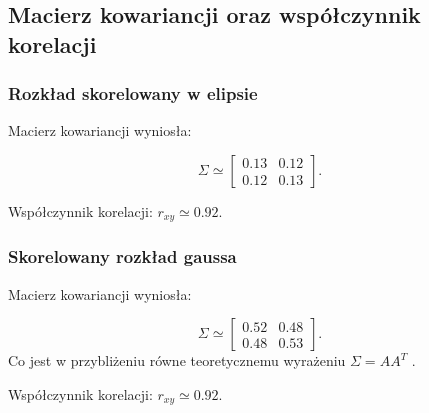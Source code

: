 \documentclass[a4paper,12pt,twoside]{article}
\begin{document}
\subsection{Macierz kowariancji oraz współczynnik korelacji}

\subsubsection{Rozkład skorelowany w elipsie}
Macierz kowariancji wyniosła:

\begin{equation*}
    \Sigma \simeq
    \begin{bmatrix}
            0.13 & 0.12 \\
            0.12 & 0.13
    \end{bmatrix}.
\end{equation*}

Współczynnik korelacji: $r_{xy} \simeq 0.92$.

\subsubsection{Skorelowany rozkład gaussa}

Macierz kowariancji wyniosła:

\begin{equation*}
    \Sigma \simeq
    \begin{bmatrix}
            0.52 & 0.48 \\
            0.48 & 0.53
    \end{bmatrix}.
\end{equation*}
Co jest w przybliżeniu równe teoretycznemu wyrażeniu $\Sigma = AA^T$ .

Współczynnik korelacji: $r_{xy} \simeq 0.92$.
\end{document}
